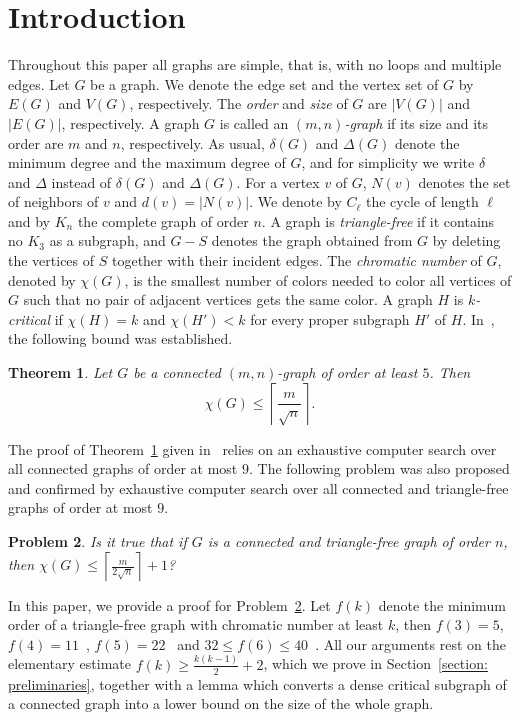 \documentclass{amsart}
\theoremstyle{plain}
\newtheorem{theorem}{Theorem}
\newtheorem{problem}[theorem]{Problem}
\begin{document}
\section{Introduction}
Throughout this paper all graphs are simple, that is, with no loops and multiple edges. Let $G$ be a graph. We denote the edge set and the vertex set of $G$ by $E(G)$ and $V(G)$, respectively. The \textit{order} and \textit{size} of $G$ are $|V(G)|$ and $|E(G)|$, respectively. A graph $G$ is called an \textit{$(m,n)$-graph} if its size and its order are $m$ and $n$, respectively. As usual, $\delta(G)$ and $\Delta(G)$ denote the minimum degree and the maximum degree of $G$, and for simplicity we write $\delta$ and $\Delta$ instead of $\delta(G)$ and $\Delta(G)$. For a vertex $v$ of $G$, $N(v)$ denotes the set of neighbors of $v$ and $d(v) = |N(v)|$. We denote by $C_\ell$ the cycle of length $\ell$ and by $K_n$ the complete graph of order $n$. A graph is \textit{triangle-free} if it contains no $K_3$ as a subgraph, and $G - S$ denotes the graph obtained from $G$ by deleting the vertices of $S$ together with their incident edges.
The \textit{chromatic number} of $G$, denoted by $\chi(G)$, is the smallest number of colors needed to color all vertices of $G$ such that no pair of adjacent vertices gets the same color.
A graph $H$ is \textit{$k$-critical} if $\chi(H) = k$ and $\chi(H') < k$ for every proper subgraph $H'$ of $H$.
In~\cite{akbari2026some}, the following bound was established.

\begin{theorem}\cite{akbari2026some} \label{theorem: m over sqrt n}
Let $G$ be a connected $(m,n)$-graph of order at least $5$. Then
$$\chi(G) \leq \left\lceil \frac{m}{\sqrt{n}} \right\rceil.$$
\end{theorem}

The proof of Theorem~\ref{theorem: m over sqrt n} given in~\cite{akbari2026some} relies on an exhaustive computer search over all connected graphs of order at most $9$. The following problem was also proposed and confirmed by exhaustive computer search over all connected and triangle-free graphs of order at most $9$.

\begin{problem}\cite{akbari2026some} \label{problem: triangle-free}
Is it true that if $G$ is a connected and triangle-free graph of order $n$, then
$\chi(G) \le \left\lceil \frac{m}{2\sqrt{n}} \right\rceil + 1$?
\end{problem}

In this paper, we provide a proof for Problem~\ref{problem: triangle-free}.
Let $f(k)$ denote the minimum order of a triangle-free graph with chromatic number at least $k$, then $f(3) = 5$, $f(4) = 11$~\cite{chvatal1974minimality}, $f(5) = 22$~\cite{jensen1995small} and $32 \leq f(6) \leq 40$~\cite{goedgebeur2020minimal}. All our arguments rest on the elementary estimate $f(k) \geq \frac{k(k-1)}{2}+2$, which we prove in Section~\ref{section: preliminaries}, together with a lemma which converts a dense critical subgraph of a connected graph into a lower bound on the size of the whole graph.
\end{document}
